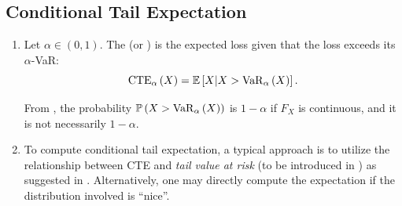 \subsection{Conditional Tail Expectation}
\begin{enumerate}
\item Let \(\alpha\in(0,1)\). The  (or ) is the expected loss given
that the loss exceeds its \(\alpha\)-VaR:
\[
\operatorname{CTE}_{\alpha}\left(X\right)=\mathbb{E}\left[X|X>\operatorname{VaR}_{\alpha}\left(X\right)\right].
\]
\begin{center}
\end{center}
\begin{note}
From , the probability
\(\mathbb{P}\left(X>\operatorname{VaR}_{\alpha}\left(X\right)\right)\) is \(1-\alpha\) if \(F_X\) is continuous, and it
is not necessarily \(1-\alpha\).
\end{note}
\item To compute conditional tail expectation, a typical approach is to utilize
the relationship between CTE and \emph{tail value at risk} (to be introduced in
) as suggested in . Alternatively,
one may directly compute the expectation if the distribution involved is
``nice''.
\end{enumerate}
